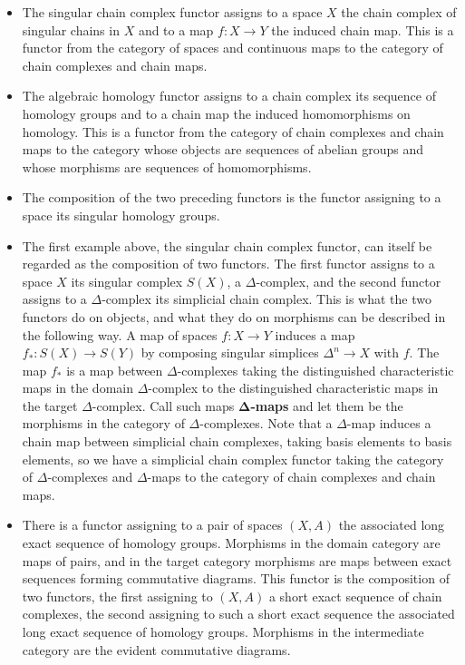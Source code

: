 \begin{itemize}
\item The singular chain complex functor assigns to a space $X$ the chain complex of singular chains in $X$ and to a map $f:X \to Y$ the induced chain map.  This is a functor from the category of spaces and continuous maps to the category of chain complexes and chain maps.

\item The algebraic homology functor assigns to a chain complex its sequence of homology groups and to a chain map the induced homomorphisms on homology. This is a functor from the category of chain complexes and chain maps to the category whose objects are sequences of abelian groups and whose morphisms are sequences of homomorphisms.

\item The composition of the two preceding functors is the functor assigning to a space its singular homology groups.

\item The first example above, the singular chain complex functor, can itself be regarded as the composition of two functors. The first functor assigns to a space $X$ its singular complex $S(X)$, a $\Delta$-complex, and the second functor assigns to a $\Delta$-complex its simplicial chain complex. This is what the two functors do on objects, and what they do on morphisms can be described in the following way. A map of spaces $f:X \to Y$ induces a map $f_*: S(X) \to S(Y)$ by composing singular simplices $\Delta^n \to X$ with $f$. The map $f_*$ is a map between $\Delta$-complexes taking the distinguished characteristic maps in the domain $\Delta$-complex to the distinguished characteristic maps in the target $\Delta$-complex. Call such maps $\mathbf{\Delta}$\textbf{-maps} and let them be the morphisms in the category of $\Delta$-complexes. Note that a $\Delta$-map induces a chain map between simplicial chain complexes, taking basis elements to basis elements, so we have a simplicial chain complex functor taking the category of $\Delta$-complexes and $\Delta$-maps to the category of chain complexes and chain maps.

\item There is a functor assigning to a pair of spaces $(X,A)$ the associated long exact sequence of homology groups. Morphisms in the domain category are maps of pairs, and in the target category morphisms are maps between exact sequences forming commutative diagrams. This functor is the composition of two functors, the first assigning to $(X,A)$ a short exact sequence of chain complexes, the second assigning to such a short exact sequence the associated long exact sequence of homology groups. Morphisms in the intermediate category are the evident commutative diagrams.
\end{itemize}

